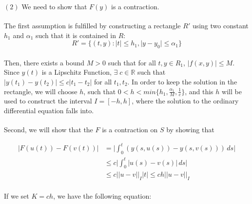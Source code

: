 \documentclass{article}
\theoremstyle{definition}
\theoremstyle{remark}
\begin{document}
$(2)$ We need to show that $F(y)$ is a contraction.

\paragraph{  }

The first assumption is fulfilled by constructing a rectangle $R'$ using two constant $h_1$ and $\alpha_1$ such that it is contained in $R$:
\begin{equation}\label{eqn:rect}
    R' = \{(t,y): \lvert t \rvert \leq h_1, \lvert y - y_0 \rvert \leq \alpha_1\}
\end{equation}

\paragraph{  }

Then, there exists a bound $M > 0$ such that for all $t, y \in R_1$, $\lvert f(x,y) \rvert \leq M$. Since $y(t)$ is a Lipschitz Function, $\exists \; c \in \mathbb{R}$ such that $\lvert y(t_1) - y(t_2) \rvert \leq c \lvert t_1 - t_2 \rvert$ for all $t_1, t_2$. In order to keep the solution in the rectangle, we will choose $h$, such that $0< h < min\{h_1,\tfrac{\alpha_1}{M}, \tfrac{1}{c}\}$, and this $h$ will be used to construct the interval $I = [-h,h]$, where the solution to the ordinary differential equation falls into.

\paragraph{  }

Second, we will show that the $F$ is a contraction on $S$ by showing that 

\begin{align}
        \lvert F(u(t)) - F(v(t)) \rvert & = \lvert \int_{0}^{t}{(y(s,u(s)) - y(s,v(s))) \,ds} \rvert\\
        & \leq c\lvert \int_{0}^{t}{\lvert u(s) - v(s) \rvert \,ds}\rvert\\
        & \leq c\lvert\lvert u - v \rvert\rvert_{I}\lvert t \rvert \leq ch\lvert\lvert u - v \rvert\rvert_{I}
\end{align}

\paragraph{  }

If we set $K = ch$, we have the following equation:
\end{document}

